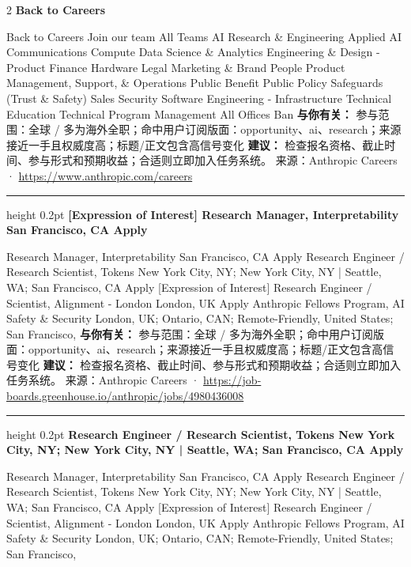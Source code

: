 \documentclass[10.5pt]{ctexart}
\begin{document}
\begin{multicols}{2}
{\large\bfseries Back to Careers}\par
Back to Careers Join our team All Teams AI Research \& Engineering Applied AI Communications Compute Data Science \& Analytics Engineering \& Design - Product Finance Hardware Legal Marketing \& Brand People Product Management, Support, \& Operations Public Benefit Public Policy Safeguards (Trust \& Safety) Sales Security Software Engineering - Infrastructure Technical Education Technical Program Management All Offices Ban
\textbf{与你有关：} 参与范围：全球 / 多为海外全职；命中用户订阅版面：opportunity、ai、research；来源接近一手且权威度高；标题/正文包含高信号变化
\textbf{建议：} 检查报名资格、截止时间、参与形式和预期收益；合适则立即加入任务系统。
{\footnotesize\color{ormuted} 来源：Anthropic Careers · \url{https://www.anthropic.com/careers}}
\vspace{2mm}
\hrule height 0.2pt
\vspace{2mm}
{\large\bfseries [Expression of Interest] Research Manager, Interpretability San Francisco, CA Apply}\par
[Expression of Interest] Research Manager, Interpretability San Francisco, CA Apply Research Engineer / Research Scientist, Tokens New York City, NY; New York City, NY | Seattle, WA; San Francisco, CA Apply [Expression of Interest] Research Engineer / Scientist, Alignment - London London, UK Apply Anthropic Fellows Program, AI Safety \& Security London, UK; Ontario, CAN; Remote-Friendly, United States; San Francisco, 
\textbf{与你有关：} 参与范围：全球 / 多为海外全职；命中用户订阅版面：opportunity、ai、research；来源接近一手且权威度高；标题/正文包含高信号变化
\textbf{建议：} 检查报名资格、截止时间、参与形式和预期收益；合适则立即加入任务系统。
{\footnotesize\color{ormuted} 来源：Anthropic Careers · \url{https://job-boards.greenhouse.io/anthropic/jobs/4980436008}}
\vspace{2mm}
\hrule height 0.2pt
\vspace{2mm}
{\large\bfseries Research Engineer / Research Scientist, Tokens New York City, NY; New York City, NY | Seattle, WA; San Francisco, CA Apply}\par
[Expression of Interest] Research Manager, Interpretability San Francisco, CA Apply Research Engineer / Research Scientist, Tokens New York City, NY; New York City, NY | Seattle, WA; San Francisco, CA Apply [Expression of Interest] Research Engineer / Scientist, Alignment - London London, UK Apply Anthropic Fellows Program, AI Safety \& Security London, UK; Ontario, CAN; Remote-Friendly, United States; San Francisco, 

\end{multicols}
\end{document}
